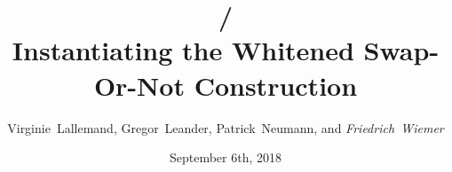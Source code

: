 \documentclass[%
    10pt,
    professionalfont,
    aspectratio=169,
]{beamer}
\title{\bison/\\ Instantiating the Whitened Swap-Or-Not Construction}
\subtitle{}
\author[Friedrich~Wiemer]{Virginie~Lallemand, Gregor~Leander, Patrick~Neumann, and \emph{Friedrich~Wiemer}}
\institute{%
    Horst Görtz Institut für IT Sicherheit\\
    Ruhr-Universität Bochum
}
\date{September 6th, 2018}
\begin{document}
\begin{frame}
    \titlepage{}
\end{frame}


\end{document}
